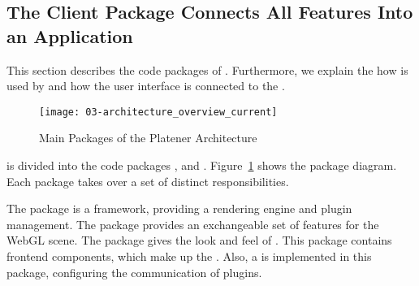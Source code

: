 \documentclass[../ClassicThesis.tex]{subfiles}
\begin{document}


\subsection{The Client Package Connects All Features Into an
  Application}
\label{sec:client-to-application}


This section describes the code packages of {\platener}.
Furthermore, we explain the how {\convertify} is used by
{\platener} and how the user interface is connected to the
.



\begin{figure}
  \texttt{[image: 03-architecture\_overview\_current]}
  \caption{Main Packages of the Platener Architecture}
  \label{fig:architectureOverviewCurrent}
\end{figure}

{\platener} is divided into the code packages {\convertify},
 and .
Figure~\ref{fig:architectureOverviewCurrent} shows the
package diagram. Each package takes over a set of distinct
responsibilities.


The {\convertify} package is a framework, providing a
rendering engine and plugin management. The 
package provides an exchangeable set of features for the
WebGL scene. The  package gives the look and
feel of {\platener}. This package contains frontend
components, which make up the {\userinterface}. Also, a
 is implemented in this package,
configuring the communication of plugins.



\end{document}
